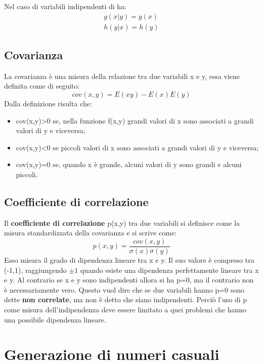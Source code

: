  Nel caso di variabili indipendenti di ha:
 \begin{align*}
     g(x|y) =g(x) \\
     h(y|x) = h(y)
 \end{align*}
 \subsection{Covarianza}
 La covarianza è una misura della relazione tra due variabili x e y, essa viene definita come di seguito:
 \[cov(x,y) = E(xy) - E(x)E(y)\]
 Dalla definizione risulta che:
\begin{itemize}
    \item cov(x,y)>0 se, nella funzione f(x,y) grandi valori di x sono associati a grandi valori di y e viceversa;
    \item cov(x,y)<0 se piccoli valori di x sono associati a grandi valori di y e viceversa;
    \item cov(x,y)=0 se, quando x è grande, alcuni valori di y sono grandi e alcuni piccoli.
\end{itemize}

\subsection{Coefficiente di correlazione}
Il \textbf{coefficiente di correlazione} p(x,y) tra due variabili si definisce come la misura standardizzata della covarianza e si scrive come:
\[p(x,y) = \dfrac{cov(x,y)}{\sigma(x) \sigma(y)}\]
Esso misura il grado di dipendenza lineare tra x e y. Il suo valore è compreso tra (-1,1), raggiungendo $\pm 1$ quando esiste una dipendenza perfettamente lineare tra x e y. Al contrario se x e y sono indipendenti allora si ha p=0, ma il contrario non è necessariamente vero. Questo vuol dire che se due variabili hanno p=0 sono dette \textbf{non correlate}, ma non è detto che siano indipendenti. Perciò l'uso di p come misura dell'indipendenza deve essere limitato a quei problemi che hanno una possibile dipendenza lineare.




\section{Generazione di numeri casuali}

